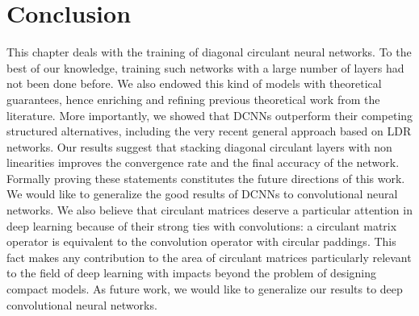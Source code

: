 \section{Conclusion}
\label{section:ch3-conclusion}

This chapter deals with the training of diagonal circulant neural networks.
To the best of our knowledge, training such networks with a large number of layers had not been done before.
We also endowed this kind of models with theoretical guarantees, hence enriching and refining previous theoretical work from the literature.
More importantly, we showed that DCNNs outperform their competing structured alternatives, including the very recent general approach based on LDR networks.
Our results suggest that stacking diagonal circulant layers with non linearities improves the convergence rate and the final accuracy of the network.
Formally proving these statements constitutes the future directions of this work.
We would like to generalize the good results of DCNNs to convolutional neural networks.
We also believe that circulant matrices deserve a particular attention in deep learning because of their strong ties with convolutions: a circulant matrix operator is equivalent to the convolution operator with circular paddings.
This fact makes any contribution to the area of circulant matrices particularly relevant to the field of deep learning with impacts beyond the problem of designing compact models.
As future work, we would like to generalize our results to deep convolutional neural networks. 


